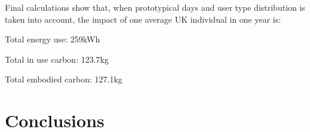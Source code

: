 \documentclass[conference]{IEEEtran}
\begin{document}

Final calculations show that, when prototypical days and user type
distribution is taken into account, the impact of one average UK
individual in one year is:

\begin{compactdesc}
\item[Total energy use:] 259kWh
\item[Total in use carbon:] 123.7kg
\item[Total embodied carbon:] 127.1kg
\end{compactdesc}







\section{Conclusions}


\end{document}
